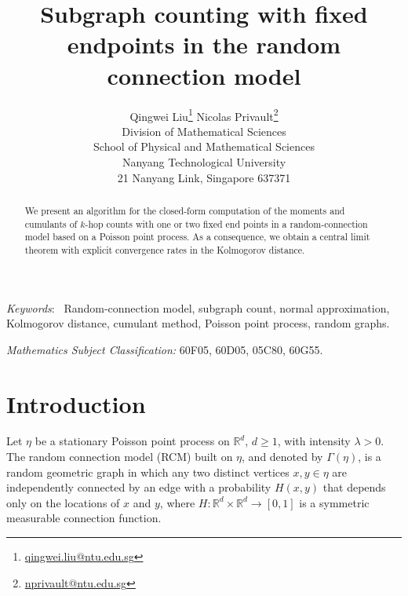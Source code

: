 \documentclass[12pt]{article}
\newcommand{\R}{\mathbb{R}}
\numberwithin{equation}{section}
\begin{document}
\title{
\huge
 Subgraph counting with fixed endpoints in the random connection model
} 

\author{
  Qingwei Liu\footnote{\href{mailto:qingwei.liu@ntu.edu.sg}{qingwei.liu@ntu.edu.sg}}
  \qquad
      Nicolas Privault\footnote{
\href{mailto:nprivault@ntu.edu.sg}{nprivault@ntu.edu.sg}
}
  \\
\small
Division of Mathematical Sciences
\\
\small
School of Physical and Mathematical Sciences
\\
\small
Nanyang Technological University
\\
\small
21 Nanyang Link, Singapore 637371
}

\maketitle

\vspace{-0.5cm}

\begin{abstract} 
 We present an algorithm for the closed-form computation
 of the moments and cumulants of $k$-hop counts
 with one or two fixed end points
 in a random-connection model based on a Poisson point process.
 As a consequence, we obtain a central limit theorem with
 explicit convergence rates in the Kolmogorov distance. 
\end{abstract}
\noindent\emph{Keywords}:~
Random-connection model, 
subgraph count,
normal approximation,
Kolmogorov distance,
cumulant method,
Poisson point process,
random graphs.

\noindent 
{\em Mathematics Subject Classification:} 
60F05, %
60D05, %
05C80, %
60G55. %
 
\baselineskip0.7cm

\section{Introduction}
\noindent
Let $\eta$ be a stationary Poisson point process on $\R^d$, $d\geq 1$, with intensity $\lambda > 0$.
The random connection model (RCM)
built on $\eta$, and denoted by $\Gamma(\eta )$,
 is a random geometric graph in which any two distinct vertices $x,y\in\eta$ are independently connected by an edge with a probability $H(x,y)$ that depends only on the locations of $x$ and $y$, where $H:\R^d\times \R^d\to[0,1]$ is a symmetric measurable connection function. 
\end{document}
